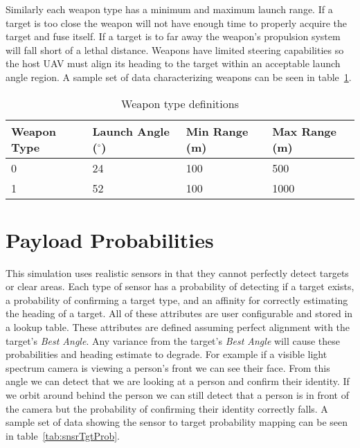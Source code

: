 Similarly each weapon type has a minimum and maximum launch range.  If a target is too close the weapon will not have enough time to properly acquire the target and fuse itself.  If a target is to far away the weapon's propulsion system will fall short of a lethal distance.  Weapons have limited steering capabilities so the host UAV must align its heading to the target within an acceptable launch angle region. A sample set of data characterizing weapons can be seen in table~\ref{tab:weaponType}.


\begin{table}[h]
	\caption{Weapon type definitions}
	\centering
	\label{tab:weaponType}
	\begin{tabular}{|p{1.5cm}|p{1.75cm}|p{1cm}|p{1cm}|}
		\hline
		Weapon Type & Launch Angle ($^{\circ}$) & Min Range (m) & Max Range (m)\\ \hline
		0 & 24 & 100 & 500 \\
		1 & 52 & 100 & 1000 \\
		\hline
	\end{tabular}
\end{table}

\section{Payload Probabilities}
This simulation uses realistic sensors in that they cannot perfectly detect targets or clear areas.  Each type of sensor has a probability of detecting if a target exists, a probability of confirming a target type, and an affinity for correctly estimating the heading of a target.  All of these attributes are user configurable and stored in a lookup table.  These attributes are defined assuming perfect alignment with the target's \textit{Best Angle}.  Any variance from the target's \textit{Best Angle} will cause these probabilities and heading estimate to degrade.  For example if a visible light spectrum camera is viewing a person's front we can see their face.  From this angle we can detect that we are looking at a person and confirm their identity.  If we orbit around behind the person we can still detect that a person is in front of the camera but the probability of confirming their identity correctly falls.  A sample set of data showing the sensor to target probability mapping can be seen in table~\ref{tab:snsrTgtProb}.

